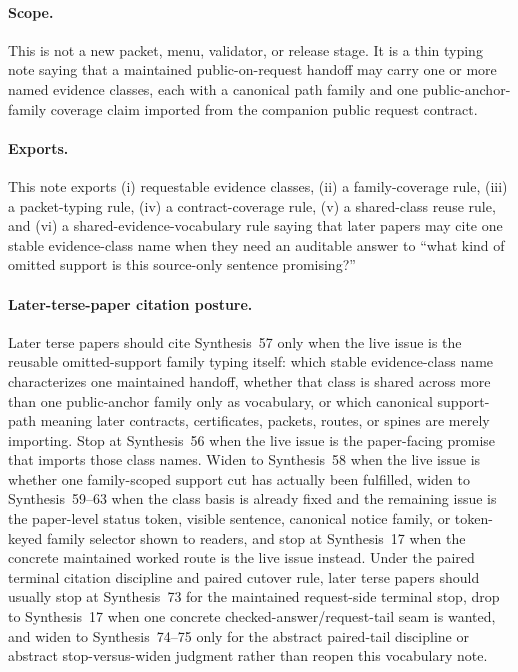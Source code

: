 \documentclass[11pt]{article}
\begin{document}
\paragraph{Scope.}
This is not a new packet, menu, validator, or release stage.
It is a thin typing note saying that a maintained public-on-request handoff may carry one or more named evidence classes, each with a canonical path family and one public-anchor-family coverage claim imported from the companion public request contract.

\paragraph{Exports.}
This note exports (i) requestable evidence classes, (ii) a family-coverage rule, (iii) a packet-typing rule, (iv) a contract-coverage rule, (v) a shared-class reuse rule, and (vi) a shared-evidence-vocabulary rule saying that later papers may cite one stable evidence-class name when they need an auditable answer to ``what kind of omitted support is this source-only sentence promising?''

\paragraph{Later-terse-paper citation posture.}
Later terse papers should cite Synthesis~57 only when the live issue is the reusable omitted-support family typing itself: which stable evidence-class name characterizes one maintained handoff, whether that class is shared across more than one public-anchor family only as vocabulary, or which canonical support-path meaning later contracts, certificates, packets, routes, or spines are merely importing. Stop at Synthesis~56 when the live issue is the paper-facing promise that imports those class names. Widen to Synthesis~58 when the live issue is whether one family-scoped support cut has actually been fulfilled, widen to Synthesis~59--63 when the class basis is already fixed and the remaining issue is the paper-level status token, visible sentence, canonical notice family, or token-keyed family selector shown to readers, and stop at Synthesis~17 when the concrete maintained worked route is the live issue instead. Under the paired terminal citation discipline and paired cutover rule, later terse papers should usually stop at Synthesis~73 for the maintained request-side terminal stop, drop to Synthesis~17 when one concrete checked-answer/request-tail seam is wanted, and widen to Synthesis~74--75 only for the abstract paired-tail discipline or abstract stop-versus-widen judgment rather than reopen this vocabulary note.\cite{series:publicrequestcontracts,series:requestfulfillmentcertificates,series:publicrequeststatusenvelopes,series:publicrequestcarryforward,series:publicrequestnotices,series:publicrequestnoticenormalforms,series:publicrequestnoticeselections,series:requestsideterminalcitationnormalform,series:pairedterminalcitationdiscipline,series:pairedterminalcutoverrules,series:workedexample}
\end{document}
